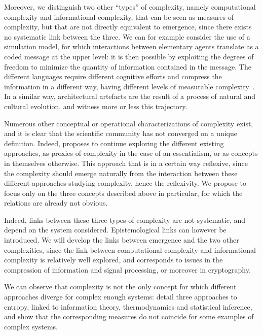 Moreover, we distinguish two other ``types'' of complexity, namely computational complexity and informational complexity, that can be seen as measures of complexity, but that are not directly equivalent to emergence, since there exists no systematic link between the three. We can for example consider the use of a simulation model, for which interactions between elementary agents translate as a coded message at the upper level: it is then possible by exploiting the degrees of freedom to minimize the quantity of information contained in the message. The different languages require different cognitive efforts and compress the information in a different way, having different levels of measurable complexity~\cite{febres2013complexity}. In a similar way, architectural artefacts are the result of a process of natural and cultural evolution, and witness more or less this trajectory.


Numerous other conceptual or operational characterizations of complexity exist, and it is clear that the scientific community has not converged on a unique definition. Indeed, \cite{chu2008criteria} proposes to continue exploring the different existing approaches, as proxies of complexity in the case of an essentialism, or as concepts in themselves otherwise. This approach that is in a certain way reflexive, since the complexity should emerge naturally from the interaction between these different approaches studying complexity, hence the reflexivity. We propose to focus only on the three concepts described above in particular, for which the relations are already not obvious.



Indeed, links between these three types of complexity are not systematic, and depend on the system considered. Epistemological links can however be introduced. We will develop the links between emergence and the two other complexities, since the link between computational complexity and informational complexity is relatively well explored, and corresponds to issues in the compression of information and signal processing, or moreover in cryptography.


We can observe that complexity is not the only concept for which different approaches diverge for complex enough systems: \cite{thurner2017three} detail three approaches to entropy, linked to information theory, thermodynamics and statistical inference, and show that the corresponding measures do not coincide for some examples of complex systems.



